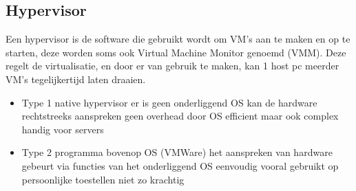 \documentclass{report}
\begin{document}
   			\subsection{Hypervisor}
   				Een hypervisor is de software die gebruikt wordt om VM's aan te maken en op te starten, deze worden soms ook Virtual Machine Monitor genoemd (VMM). Deze regelt de virtualisatie, en door er van gebruik te maken, kan 1 host pc meerder VM's tegelijkertijd laten draaien. 
   				\begin{itemize}
   					\item Type 1
   						\subitem native hypervisor
   						\subitem er is geen onderliggend OS
   						\subitem kan de hardware rechtstreeks aanspreken
   						\subitem geen overhead door OS
   						\subitem efficient maar ook complex
   						\subitem handig voor servers
   					\item Type 2
   						\subitem programma bovenop OS (VMWare)
   						\subitem het aanspreken van hardware gebeurt via functies van het onderliggend OS
   						\subitem eenvoudig 
   						\subitem vooral gebruikt op persoonlijke toestellen 
   						\subitem niet zo krachtig
   				\end{itemize}
\end{document}
